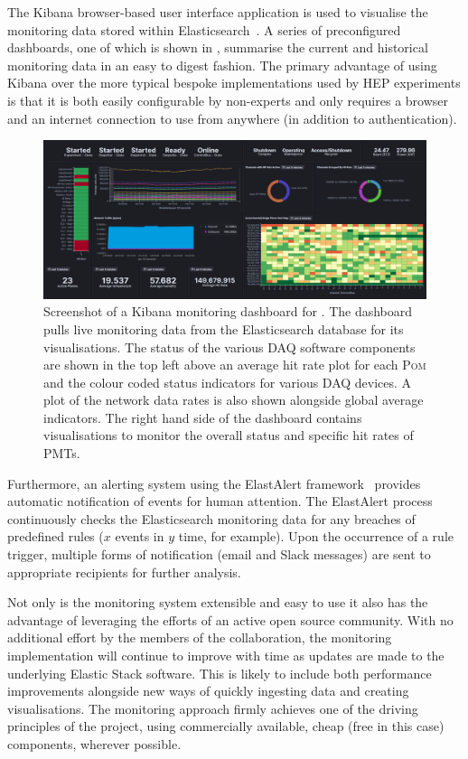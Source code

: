 The Kibana browser-based user interface application is used to visualise the monitoring data
stored within Elasticsearch~\cite{kibana2020}. A series of preconfigured dashboards, one of which
is shown in , summarise the current and historical monitoring data in an
easy to digest fashion. The primary advantage of using Kibana over the more typical bespoke
implementations used by HEP experiments is that it is both easily configurable by non-experts and
only requires a browser and an internet connection to use from anywhere (in addition to
authentication).

\begin{figure} %
    \includegraphics[width=\textwidth]{diagrams/5-daq/monitoring.pdf}
    \caption[Screenshot of a Kibana monitoring dashboard for \chipsfive]
    {Screenshot of a Kibana monitoring dashboard for \chipsfive. The dashboard pulls live
    monitoring data from the Elasticsearch database for its visualisations. The status of the
    various DAQ software components are shown in the top left above an average hit rate plot for
    each \textsc{Pom} and the colour coded status indicators for various DAQ devices. A plot of
    the network data rates is also shown alongside global average indicators. The right hand side
    of the dashboard contains visualisations to monitor the overall status and specific hit rates
    of PMTs.}
    \label{fig:monitoring}
\end{figure}

Furthermore, an alerting system using the ElastAlert framework~\cite{elastalert2020} provides
automatic notification of events for human attention. The ElastAlert process continuously checks
the Elasticsearch monitoring data for any breaches of predefined rules ($x$ events in $y$ time,
for example). Upon the occurrence of a rule trigger, multiple forms of notification (email and
Slack messages) are sent to appropriate recipients for further analysis.

Not only is the \chipsfive monitoring system extensible and easy to use it also has the advantage
of leveraging the efforts of an active open source community. With no additional effort by the
members of the \chips collaboration, the monitoring implementation will continue to improve with
time as updates are made to the underlying Elastic Stack software. This is likely to include both
performance improvements alongside new ways of quickly ingesting data and creating visualisations.
The monitoring approach firmly achieves one of the driving principles of the \chips project, using
commercially available, cheap (free in this case) components, wherever possible.